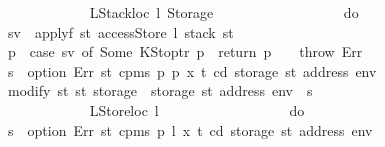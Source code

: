 \begin{isabellebody}
\ \ \ \ \ \ \ \ \ \ \ \ \ \ \ \ {\isacharbraceright}{\kern0pt}\isanewline
\ \ \ \ \ \ \ \ \ \ \ \ {\isacharbar}{\kern0pt}\ {\isacharparenleft}{\kern0pt}LStackloc\ l{\isacharcomma}{\kern0pt}\ Storage\ {\isacharunderscore}{\kern0pt}{\isacharparenright}{\kern0pt}\ {\isasymRightarrow}\isanewline
\ \ \ \ \ \ \ \ \ \ \ \ \ \ \ \ do\ {\isacharbraceleft}{\kern0pt}\isanewline
\ \ \ \ \ \ \ \ \ \ \ \ \ \ \ \ \ \ sv\ {\isasymleftarrow}\ applyf\ {\isacharparenleft}{\kern0pt}{\isasymlambda}st{\isachardot}{\kern0pt}\ accessStore\ l\ {\isacharparenleft}{\kern0pt}stack\ st{\isacharparenright}{\kern0pt}{\isacharparenright}{\kern0pt}{\isacharsemicolon}{\kern0pt}\isanewline
\ \ \ \ \ \ \ \ \ \ \ \ \ \ \ \ \ \ p{\isacharprime}{\kern0pt}\ {\isasymleftarrow}\ case\ sv\ of\ Some\ {\isacharparenleft}{\kern0pt}KStoptr\ p{\isacharprime}{\kern0pt}{\isacharparenright}{\kern0pt}\ {\isasymRightarrow}\ return\ p{\isacharprime}{\kern0pt}\ {\isacharbar}{\kern0pt}\ {\isacharunderscore}{\kern0pt}\ {\isasymRightarrow}\ throw\ Err{\isacharsemicolon}{\kern0pt}\isanewline
\ \ \ \ \ \ \ \ \ \ \ \ \ \ \ \ \ \ s\ {\isasymleftarrow}\ option\ Err\ {\isacharparenleft}{\kern0pt}{\isasymlambda}st{\isachardot}{\kern0pt}\ cpm{}s\ p\ p{\isacharprime}{\kern0pt}\ x\ t\ cd\ {\isacharparenleft}{\kern0pt}storage\ st\ {\isacharparenleft}{\kern0pt}address\ env{\isacharparenright}{\kern0pt}{\isacharparenright}{\kern0pt}{\isacharparenright}{\kern0pt}{\isacharsemicolon}{\kern0pt}\isanewline
\ \ \ \ \ \ \ \ \ \ \ \ \ \ \ \ \ \ modify\ {\isacharparenleft}{\kern0pt}{\isasymlambda}st{\isachardot}{\kern0pt}\ st\ {\isasymlparr}storage\ {\isacharcolon}{\kern0pt}{\isacharequal}{\kern0pt}\ {\isacharparenleft}{\kern0pt}storage\ st{\isacharparenright}{\kern0pt}\ {\isacharparenleft}{\kern0pt}address\ env\ {\isacharcolon}{\kern0pt}{\isacharequal}{\kern0pt}\ s{\isacharparenright}{\kern0pt}{\isasymrparr}{\isacharparenright}{\kern0pt}\isanewline
\ \ \ \ \ \ \ \ \ \ \ \ \ \ \ \ {\isacharbraceright}{\kern0pt}\isanewline
\ \ \ \ \ \ \ \ \ \ \ \ {\isacharbar}{\kern0pt}\ {\isacharparenleft}{\kern0pt}LStoreloc\ l{\isacharcomma}{\kern0pt}\ {\isacharunderscore}{\kern0pt}{\isacharparenright}{\kern0pt}\ {\isasymRightarrow}\isanewline
\ \ \ \ \ \ \ \ \ \ \ \ \ \ \ \ do\ {\isacharbraceleft}{\kern0pt}\isanewline
\ \ \ \ \ \ \ \ \ \ \ \ \ \ \ \ \ \ s\ {\isasymleftarrow}\ option\ Err\ {\isacharparenleft}{\kern0pt}{\isasymlambda}st{\isachardot}{\kern0pt}\ cpm{}s\ p\ l\ x\ t\ cd\ {\isacharparenleft}{\kern0pt}storage\ st\ {\isacharparenleft}{\kern0pt}address\ env{\isacharparenright}{\kern0pt}{\isacharparenright}{\kern0pt}{\isacharparenright}{\kern0pt}{\isacharsemicolon}{\kern0pt}\isanewline

\end{isabellebody}
